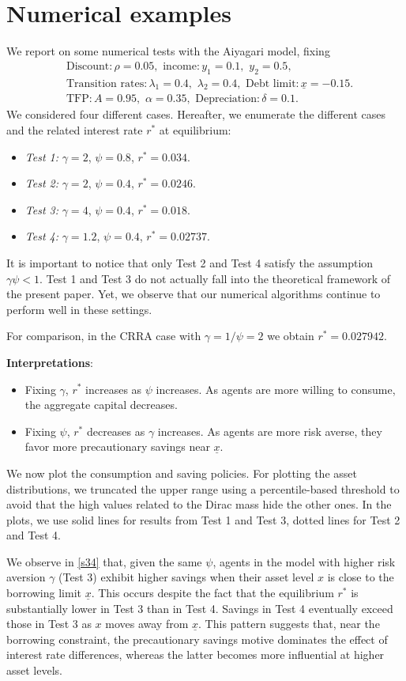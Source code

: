 \documentclass[11pt]{article}
\numberwithin{equation}{section}
\theoremstyle{definition}
\newcommand{\ux}{{\underline x}}
\newcommand{\beq}{\begin{equation}}
\newcommand{\eeq}{\end{equation}}
\newcommand{\g}{\gamma}
\newcommand{\p}{\psi}
\theoremstyle{plain}
\begin{document}
\section{Numerical examples}\label{Sec: numerical}
We report on some numerical tests with the Aiyagari model, fixing 
\beq
\begin{aligned}
&\text{Discount}: \rho=0.05,\,\,\text{income}: y_1=0.1,\,\,y_2=0.5,\\
&\text{Transition rates}: \lambda_1=0.4,\,\,\lambda_2=0.4,\,\,\text{Debt limit}:  \ux=-0.15.\\
&\text{TFP}: A=0.95,\,\,\alpha=0.35,\,\,\text{Depreciation}: \delta=0.1.
\end{aligned}
\eeq
We considered four different cases. Hereafter, we enumerate the different cases and the related interest rate $r^*$ at equilibrium:
\begin{itemize}
\item {\textit{Test 1:}} $\g=2$, $\psi=0.8$, $r^*=0.034$.
\item {\textit{Test 2:}} $\g=2$, $\psi=0.4$, $r^*=0.0246$.
\item {\textit{Test 3:}} $\g=4$, $\psi=0.4$, $r^*=0.018$.
\item {\textit{Test 4:}} $\g=1.2$, $\psi=0.4$, $r^*=0.02737$.
\end{itemize}
It is important to notice that only Test 2 and Test 4 satisfy the assumption $\g \p<1$. Test 1 and Test 3 do not actually fall into the theoretical framework of the present paper. Yet, we observe that our numerical algorithms continue to perform well in these settings. \par
For comparison, in the CRRA case with $\g=1/\p=2$ we obtain $r^*=0.027942$.\par
{\bf{Interpretations}}:
\begin{itemize}
\item Fixing $\g$, $r^*$ increases as $\psi$ increases. As agents are more willing to consume, the aggregate capital {}{decreases}. 
\item Fixing $\psi$, $r^*$ decreases as $\g$ increases. As agents are more risk averse, they favor more precautionary savings near $\ux$. \end{itemize}
We now plot the consumption and {}{saving policies}. For plotting the asset distributions, we truncated the upper range using a percentile-based threshold to avoid that the high values related to the Dirac mass hide the other ones. In the plots, we use solid lines for results from Test 1 and Test 3, dotted lines for Test 2 and Test 4. \par
{We observe in \cref{s34} that, given the same $\p$, agents in the model with higher risk aversion $\g$ (Test 3) exhibit higher savings when their asset level $x$ is close to the borrowing limit $\ux$. This occurs despite the fact that the equilibrium $r^*$ is substantially lower in Test 3 than in Test 4. Savings in Test 4 eventually exceed those in Test 3 as $x$ moves away from $\ux$. This pattern suggests that, near the borrowing constraint, the precautionary savings motive dominates the effect of interest rate differences, whereas the latter becomes more influential at higher asset levels.} 
\end{document}
